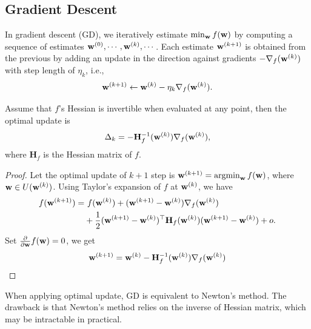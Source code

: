 \subsection{Gradient Descent}
\begin{definition}
In gradient descent (GD), we iteratively estimate $\min_{\mathbf{w}} f(\mathbf{w})$ by computing a sequence of estimates $\mathbf{w}^{(0)}, \cdots, \mathbf{w}^{(k)}, \cdots$. Each estimate $\mathbf{w}^{(k+1)}$ is obtained from the previous by adding an update in the direction against gradients $-\nabla_f(\mathbf{w}^{(k)})$ with step length of $\eta_k$, i.e.,
\begin{equation}
	\mathbf{w}^{(k+1)} \leftarrow \mathbf{w}^{(k)} - \eta_k \nabla_f(\mathbf{w}^{(k)}).
\end{equation}
\end{definition}
\begin{property}
	Assume that $f$’s Hessian is invertible when evaluated at any point, then the optimal update is 
	$$
	\Delta_k = -\mathbf{H}_f^{-1}(\mathbf{w}^{(k)}) \nabla_f(\mathbf{w}^{(k)}), 
	$$
	where $\mathbf{H}_f$ is the Hessian matrix of $f$.
\end{property}
\begin{proof}
	Let the optimal update of $k + 1$ step is $\mathbf{w}^{(k+1)} = \operatorname*{argmin}_{\mathbf{w}} f(\mathbf{w})$, where $\mathbf{w} \in U(\mathbf{w}^{(k)})$. Using Taylor's expansion of $f$ at $\mathbf{w}^{(k)}$, we have
	\begin{align}
		f(\mathbf{w}^{(k+1)}) = & \ f(\mathbf{w}^{(k)}) + (\mathbf{w}^{(k+1)} - \mathbf{w}^{(k)}) \nabla_f(\mathbf{w}^{(k)}) \\ & + \frac{1}{2} (\mathbf{w}^{(k+1)} - \mathbf{w}^{(k)})^\top \mathbf{H}_f(\mathbf{w}^{(k)}) (\mathbf{w}^{(k+1)} - \mathbf{w}^{(k)}) + o.
	\end{align}
	Set $ \frac{\partial}{\partial \mathbf{w}}f(\mathbf{w}) = 0$, we get
	\begin{align}
		\mathbf{w}^{(k + 1)} = \mathbf{w}^{(k)} -\mathbf{H}_f^{-1}(\mathbf{w}^{(k)}) \nabla_f(\mathbf{w}^{(k)})
	\end{align}
\end{proof}

\noindent \remark When applying optimal update, GD is equivalent to Newton's method. The drawback is that Newton's method relies on the inverse of Hessian matrix, which may be intractable in practical.

